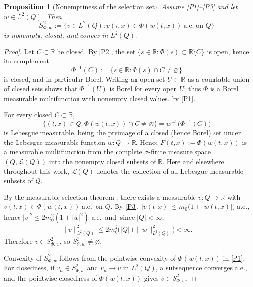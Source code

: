 \documentclass[11pt]{elsarticle}
\newtheorem{proposition}[theorem]{Proposition}
\theoremstyle{definition}
\theoremstyle{remark}
\numberwithin{equation}{section}
\begin{document}
\begin{proposition}[Nonemptiness of the selection set]
	\label{prop:bk-selection}
	Assume {\rm \ref{P1}--\ref{P3}} and let $w\in L^2(Q)$. Then
	\[
	S^2_{\Phi,w}
	:=
	\bigl\{v\in L^2(Q) : v(t,x)\in\Phi(w(t,x))\ \text{a.e.\ on } Q\bigr\}
	\]
	is nonempty, closed, and convex in $L^2(Q)$.
\end{proposition}

\begin{proof}
	Let $C\subset\mathbb{R}$ be closed. By \ref{P2}, the set
	$\{s\in\mathbb{R}:\Phi(s)\subset\mathbb{R}\setminus C\}$ is open,
	hence its complement
	\[
	\Phi^{-1}(C):=\{s\in\mathbb{R}:\Phi(s)\cap C\neq\varnothing\}
	\]
	is closed, and in particular Borel. Writing an open set
	$U\subset\mathbb{R}$ as a countable union of closed sets shows that
	$\Phi^{-1}(U)$ is Borel for every open $U$; thus $\Phi$ is a Borel
	measurable multifunction with nonempty closed values, by
	\ref{P1}.
	
	For every closed $C\subset\mathbb{R}$,
	\[
	\bigl\{(t,x)\in Q : \Phi(w(t,x))\cap C\neq\varnothing\bigr\}
	= w^{-1}\bigl(\Phi^{-1}(C)\bigr)
	\]
	is Lebesgue measurable, being the preimage of a closed (hence
	Borel) set under the Lebesgue measurable function $w:Q\to\mathbb{R}$.
	Hence $F(t,x):=\Phi(w(t,x))$ is a measurable multifunction from the
	complete $\sigma$-finite measure space $(Q,\mathscr{L}(Q))$ into the
	nonempty closed subsets of $\mathbb{R}$.
	Here and elsewhere throughout this work, $\mathscr{L}(Q)$ denotes 
	the collection of all Lebesgue measurable subsets of $Q$.
	
	By the measurable selection theorem
	\cite[Theorem~8.1.3]{aubin_frankowska_2009}, there exists a
	measurable $v:Q\to\mathbb{R}$ with $v(t,x)\in\Phi(w(t,x))$ a.e.\ on
	$Q$. By \ref{P3},
	$|v(t,x)|\le m_0\bigl(1+|w(t,x)|\bigr)$ a.e., hence
	$|v|^2\le2m_0^2(1+|w|^2)$ a.e.\ and, since $|Q|<\infty$,
	\begin{equation}\label{eq:bk-selection-bound}
		\|v\|_{L^2(Q)}^2\le 2m_0^2\bigl(|Q|+\|w\|_{L^2(Q)}^2\bigr)<\infty.
	\end{equation}
	Therefore $v\in S^2_{\Phi,w}$, so $S^2_{\Phi,w}\neq\varnothing$.
	
	Convexity of $S^2_{\Phi,w}$ follows from the pointwise convexity of
	$\Phi(w(t,x))$ in \ref{P1}. For closedness, if $v_n\in
	S^2_{\Phi,w}$ and $v_n\to v$ in $L^2(Q)$, a subsequence converges
	a.e., and the pointwise closedness of $\Phi(w(t,x))$ gives
	$v\in S^2_{\Phi,w}$.
\end{proof}
\end{document}
